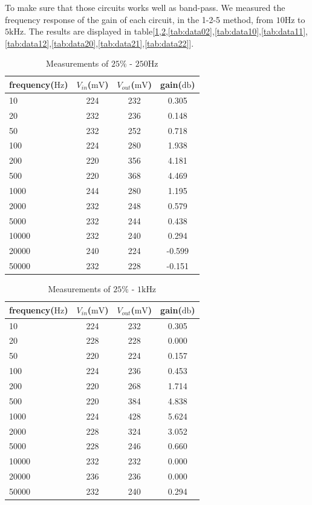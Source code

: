 To make sure that those circuits works well as band-pass. We measured the frequency response of the gain of each circuit, in the 1-2-5 method, from $10\si{\hertz}$ to $5\si{\kilo\hertz}$. The results are displayed in table[\ref{tab:data00},\ref{tab:data01},\ref{tab:data02},\ref{tab:data10},\ref{tab:data11},\ref{tab:data12},\ref{tab:data20},\ref{tab:data21},\ref{tab:data22}].

\begin{table}[!htbp]
	\centering
	\caption{Measurements of $25\%$ - $250\si{\hertz}$}
	\label{tab:data00}
	\begin{tabular}{lccc}
		\toprule
		frequency($\si{\hertz}$) & $V_{in}$($\si{\milli\volt}$) & $V_{out}$($\si{\milli\volt}$) & gain($\si{\decibel}$) \\
		\midrule
		10	&224&	232&	0.305\\
		20	&232&	236&	0.148\\
		50	&232&	252&	0.718\\
		100	&224&	280&	1.938\\
		200	&220&	356&	4.181\\
		500	&220&	368&	4.469\\
		1000&	244&	280&	1.195\\
		2000&	232&	248&	0.579\\
		5000&	232&	244&	0.438\\
		10000&	232&	240&	0.294\\
		20000&	240&	224&	-0.599\\
		50000&	232&	228&	-0.151\\
		\bottomrule
	\end{tabular}
\end{table}

\begin{table}[!htbp]
	\centering
	\caption{Measurements of $25\%$ - $1\si{\kilo\hertz}$}
	\label{tab:data01}
	\begin{tabular}{lccc}
		\toprule
		frequency($\si{\hertz}$) & $V_{in}$($\si{\milli\volt}$) & $V_{out}$($\si{\milli\volt}$) & gain($\si{\decibel}$) \\
		\midrule
		10&	224&	232&	0.305\\
		20&	228&	228&	0.000\\
		50&	220&	224&	0.157\\
		100&	224&	236&	0.453\\
		200&	220&	268&	1.714\\
		500&	220&	384&	4.838\\
		1000&	224&	428&	5.624\\
		2000&	228&	324&	3.052\\
		5000&	228&	246&	0.660\\
		10000&	232&	232&	0.000\\
		20000&	236&	236&	0.000\\
		50000&	232&	240&	0.294\\
		\bottomrule
	\end{tabular}
\end{table}

